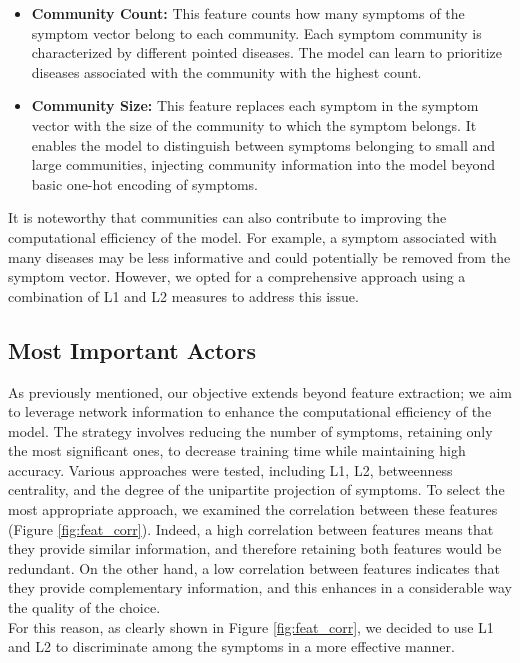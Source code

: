 \begin{itemize}
    \setlength\itemsep{1em} %

    \item \textbf{Community Count:} This feature counts how many symptoms of the symptom vector belong to each community.
          Each symptom community is characterized by different pointed diseases. The model can learn to prioritize
          diseases associated with the community with the highest count.

    \item \textbf{Community Size:} This feature replaces each symptom in the symptom vector with the size of the
          community to which the symptom belongs. It enables the model to distinguish between symptoms belonging to small and
          large communities, injecting community information into the model beyond basic one-hot encoding of symptoms.
\end{itemize}
\noindent
\vspace{0.4cm}
It is noteworthy that communities can also contribute to improving the computational efficiency of the model.
For example, a symptom associated with many diseases may be less informative and could potentially be removed from the
symptom vector. However, we opted for a comprehensive approach using a combination of L1 and L2 measures to address this issue.


\subsection{Most Important Actors}
\label{subsec:most_important_actors}

As previously mentioned, our objective extends beyond feature extraction; we aim to leverage network information to
enhance the computational efficiency of the model. The strategy involves reducing the number of symptoms,
retaining only the most significant ones, to decrease training time while maintaining high accuracy.
Various approaches were tested, including L1, L2, betweenness centrality, and the degree of the unipartite projection
of symptoms. To select the most appropriate approach, we examined the correlation between these features
(Figure \ref{fig:feat_corr}). Indeed, a high correlation between features means that they provide
similar information, and therefore retaining both features would be redundant. On the other hand,
a low correlation between features indicates that they provide complementary information, and this enhances 
in a considerable way the quality of the choice.\\
For this reason, as clearly shown in Figure \ref{fig:feat_corr}, we decided to use L1 and L2 to discriminate 
among the symptoms in a more effective manner.

